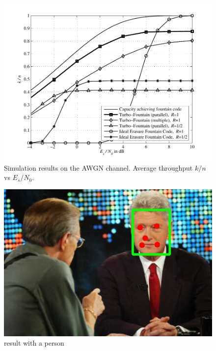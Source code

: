 \documentclass[journal, a4paper]{IEEEtran}
\begin{document}
	\begin{figure}[!hbt]
		\begin{center}
		\includegraphics[width=\columnwidth]{plot_tf}
		\caption{Simulation results on the AWGN channel. Average throughput $k/n$ vs $E_s/N_0$.}
		\label{fig:tf_plot}
		\end{center}
	\end{figure}
	
		\begin{figure}[!hbt]
		\begin{center}
		\includegraphics[width=\columnwidth]{images/13869.jpg}
		\caption{result with a person}
		\label{fig:13869}
		\end{center}
	\end{figure}
\end{document}

